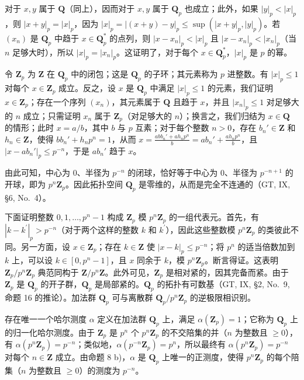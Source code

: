 对于 \(x, y\) 属于 \(\mathbf{Q}\)（同上），因而对于 \(x, y\) 属于 \(\mathbf{Q}_p\) 也成立；此外，如果 \(|y|_p < |x|_p\)，则 \(|x + y|_p = |x|_p\)，因为 \(|x|_p = |(x + y) - y|_p \leqslant \sup(|x + y|_p, |y|_p)\)。若 \((x_n)\) 是 \(\mathbf{Q}_p\) 中趋于 \(x \in \mathbf{Q}_p^*\) 的点列，则 \(|x - x_n|_p < |x|_p\) 且 \(|x - x_n|_p < |x_n|_p\)（当 \(n\) 足够大时），所以 \(|x|_p = |x_n|_p\)。这证明了，对于每个 \(x \in \mathbf{Q}_p^*\)，\(|x|_p\) 是 \(p\) 的幂。

令 \(\mathbf{Z}_p\) 为 \(\mathbf{Z}\) 在 \(\mathbf{Q}_p\) 中的闭包；这是 \(\mathbf{Q}_p\) 的子环；其元素称为 \(p\) 进整数。有 \(|x|_p \leqslant 1\) 对每个 \(x \in \mathbf{Z}_p\) 成立。反之，设 \(x\) 是 \(\mathbf{Q}_p\) 中满足 \(|x|_p \leqslant 1\) 的元素，我们证明 \(x \in \mathbf{Z}_p\)；存在一个序列 \((x_n)\)，其元素属于 \(\mathbf{Q}\) 且趋于 \(x\)，并且 \(|x_n|_p \leqslant 1\) 对足够大的 \(n\) 成立；只需证明 \(x_n\) 属于 \(\mathbf{Z}_p\)（对足够大的 \(n\)）；换言之，我们归结为 \(x \in \mathbf{Q}\) 的情形；此时 \(x = a/b\)，其中 \(b\) 与 \(p\) 互素；对于每个整数 \(n > 0\)，存在 \(b_n' \in \mathbf{Z}\) 和 \(h_n \in \mathbf{Z}\)，使得 \(bb_n' + h_np^n = 1\)，从而 \(x = \frac{abb_n' + ah_np^n}{b} = ab_n' + \frac{ah_np^n}{b}\)，且 \(|x - ab_n'|_p \leqslant p^{-n}\)，于是 \(ab_n'\) 趋于 \(x\)。

由此可知，中心为 0、半径为 \(p^{-n}\) 的闭球，恰好等于中心为 0、半径为 \(p^{-n+1}\) 的开球，即为 \(p^n\mathbf{Z}_p\)。因此拓扑空间 \(\mathbf{Q}_p\) 是零维的，从而是完全不连通的（GT, IX, §6, No.~4）。

下面证明整数 \(0,1,\ldots,p^{n}-1\) 构成 \(\mathbf{Z}_{p}\) 模 \(p^{n}\mathbf{Z}_{p}\) 的一组代表元。首先，有 \(|k-k^{\prime}|_{p}>p^{-n}\)（对于两个这样的整数 \(k\) 和 \(k^{\prime}\)），因此这些整数模 \(p^{n}\mathbf{Z}_{p}\) 的类彼此不同。另一方面，设 \(x\in\mathbf{Z}_{p}\)；存在 \(k\in\mathbf{Z}\) 使 \(|x-k|_{p}\leqslant p^{-n}\)；将 \(p^{n}\) 的适当倍数加到 \(k\) 上，可以设 \(k\in[0,p^{n}-1]\)，且 \(x\) 同余于 \(k\)，模 \(p^{n}\mathbf{Z}_{p}\)。断言得证。这表明 \(\mathbf{Z}_{p}/p^{n}\mathbf{Z}_{p}\) 典范同构于 \(\mathbf{Z}/p^{n}\mathbf{Z}\)。此外可见，\(\mathbf{Z}_{p}\) 是相对紧的，因其完备而紧。由于 \(\mathbf{Z}_{p}\) 是 \(\mathbf{Q}_{p}\) 的开子群，\(\mathbf{Q}_{p}\) 是局部紧的。\(\mathbf{Q}_{p}\) 的拓扑有可数基（GT, IX, §2, No.~9, 命题 16 的推论）。加法群 \(\mathbf{Q}_{p}\) 可与离散群 \(\mathbf{Q}_{p}/p^{n}\mathbf{Z}_{p}\) 的逆极限相识别。

存在唯一一个哈尔测度 \(\alpha\) 定义在加法群 \(\mathbf{Q}_p\) 上，满足 \(\alpha(\mathbf{Z}_p) = 1\)；它称为 \(\mathbf{Q}_p\) 上的归一化哈尔测度。由于 \(\mathbf{Z}_p\) 是 \(p^n\) 个 \(p^n\mathbf{Z}_p\) 的不交陪集的并（\(n\) 为整数且 \(\geqslant 0\)），有 \(\alpha(p^n\mathbf{Z}_p) = p^{-n}\)；类似地，\(\alpha(p^{-n}\mathbf{Z}_p) = p^n\)，所以最终有 \(\alpha(p^n\mathbf{Z}_p) = p^{-n}\) 对每个 \(n \in \mathbf{Z}\) 成立。由命题 8 b)，\(\alpha\) 是 \(\mathbf{Q}_p\) 上唯一的正测度，使得 \(p^n\mathbf{Z}_p\) 的每个陪集（\(n\) 为整数且 \(\geqslant 0\)）的测度为 \(p^{-n}\)。

